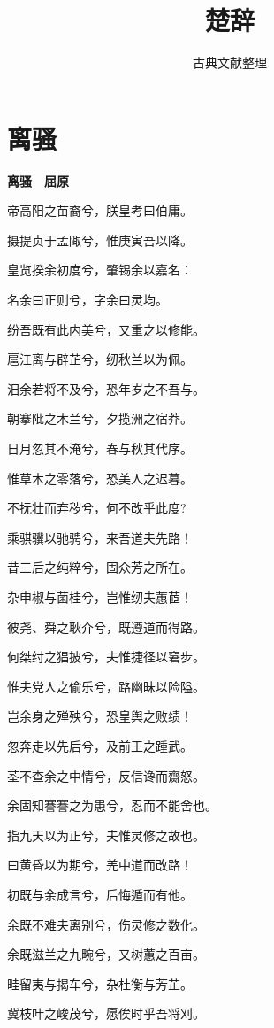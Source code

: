 \documentclass[12pt,a4paper]{ctexbook}
\title{楚辞}
\author{古典文献整理}
\date{}
\begin{document}
\maketitle
\tableofcontents
\newpage
\section{离骚}
\textbf{离骚　屈原}\par\vspace{0.5em}
帝高阳之苗裔兮，朕皇考曰伯庸。\par
摄提贞于孟陬兮，惟庚寅吾以降。\par
皇览揆余初度兮，肇锡余以嘉名：\par
名余曰正则兮，字余曰灵均。\par
纷吾既有此内美兮，又重之以修能。\par
扈江离与辟芷兮，纫秋兰以为佩。\par
汨余若将不及兮，恐年岁之不吾与。\par
朝搴阰之木兰兮，夕揽洲之宿莽。\par
日月忽其不淹兮，春与秋其代序。\par
惟草木之零落兮，恐美人之迟暮。\par
不抚壮而弃秽兮，何不改乎此度?\par
乘骐骥以驰骋兮，来吾道夫先路！\par
昔三后之纯粹兮，固众芳之所在。\par
杂申椒与菌桂兮，岂惟纫夫蕙茝！\par
彼尧、舜之耿介兮，既遵道而得路。\par
何桀纣之猖披兮，夫惟捷径以窘步。\par
惟夫党人之偷乐兮，路幽昧以险隘。\par
岂余身之殚殃兮，恐皇舆之败绩！\par
忽奔走以先后兮，及前王之踵武。\par
荃不查余之中情兮，反信谗而齌怒。\par
余固知謇謇之为患兮，忍而不能舍也。\par
指九天以为正兮，夫惟灵修之故也。\par
曰黄昏以为期兮，羌中道而改路！\par
初既与余成言兮，后悔遁而有他。\par
余既不难夫离别兮，伤灵修之数化。\par
余既滋兰之九畹兮，又树蕙之百亩。\par
畦留夷与揭车兮，杂杜衡与芳芷。\par
冀枝叶之峻茂兮，愿俟时乎吾将刈。\par
\end{document}
